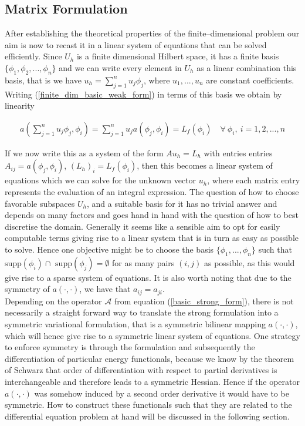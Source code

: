 \documentclass[../draft_1.tex]{subfiles}
\begin{document}
\subsection{Matrix Formulation}
After establishing the theoretical properties of the finite--dimensional problem our aim is now to recast it in a linear system of equations that can be solved efficiently. Since $U_h$ is a finite dimensional Hilbert space, it has a finite basis $\{\phi_1, \phi_2, ..., \phi_n \}$ and we can write every element in $U_h$ as a linear combination this basis, that is we have $u_h = \sum_{j=1}^{n} u_j \phi_j$, where $u_1, ..., u_n$ are constant coefficients. Writing (\ref{finite_dim_basic_weak_form}) in terms of this basis we obtain by linearity
\begin{ceqn}
\begin{equation}
\begin{aligned}
a(\sum_{j=1}^{n} u_j \phi_j, \phi_i) = \sum_{j=1}^{n} u_j a(\phi_j, \phi_i) = L_f(\phi_i) \quad \forall \ \phi_i, \ i = 1, 2, ..., n 
\end{aligned}
\end{equation}
\end{ceqn}
If we now write this as a system of the form $A u_h = L_h$ with entries entries $A_{ij} = a(\phi_j, \phi_i)$, $(L_h)_i = L_f(\phi_i)$, then this becomes a linear system of equations which we can solve for the unknown vector $u_h$, where each matrix entry represents the evaluation of an integral expression. The question of how to choose favorable subspaces $U_h$, and a suitable basis for it has no trivial answer and depends on many factors and goes hand in hand with the question of how to best discretise the domain. Generally it seems like a sensible aim to opt for easily computable terms giving rise to a linear system that is in turn as easy as possible to solve. Hence one objective might be to choose the basis $\{\phi_1, ..., \phi_n\}$ such that $ \text{supp}(\phi_i) \cap \text{ supp}(\phi_j) = \emptyset$ for as many pairs $(i,j)$ as possible, as this would give rise to a sparse system of equations. It is also worth noting that due to the symmetry of $a(\cdot, \cdot)$, we have that $a_{ij}= a_{ji}$.
\smallskip
\\
Depending on the operator $\mathcal{A}$ from equation (\ref{basic_strong_form}), there is not necessarily a straight forward way to translate the strong formulation into a symmetric variational formulation, that is a symmetric bilinear mapping $a(\cdot, \cdot)$, which will hence give rise to a symmetric linear system of equations. One strategy to enforce symmetry is through the formulation and subsequently the differentiation of particular energy functionals, because we know by the theorem of Schwarz that order of differentiation with respect to partial derivatives is interchangeable and therefore leads to a symmetric Hessian. Hence if the operator $a(\cdot, \cdot)$ was somehow induced by a second order derivative it would have to be symmetric. How to construct these functionals such that they are related to the differential equation problem at hand will be discussed in the following section.
\end{document}
